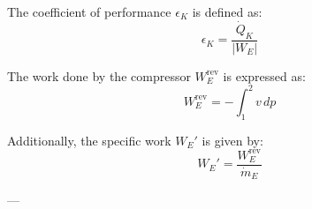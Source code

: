 The coefficient of performance \( \epsilon_K \) is defined as:  
\[
\epsilon_K = \frac{\dot{Q}_K}{|W_E|}
\]  

The work done by the compressor \( W_E^{\text{rev}} \) is expressed as:  
\[
W_E^{\text{rev}} = - \int_{1}^{2} v \, dp
\]  

Additionally, the specific work \( W_E' \) is given by:  
\[
W_E' = \frac{W_E^{\text{rev}}}{\dot{m}_E}
\]  

---
